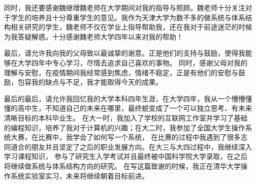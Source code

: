同时，我还要感谢魏继增魏老师在大学期间对我的指导与照顾。魏老师十分关注对于学生的培养且十分尊重学生的意见。我作为天津大学为数不多的做系统与体系结构相关研究的学生，魏老师不仅在学业上指导帮助我，还在我对于前途迷茫的时候为我答疑解惑。十分感谢魏老师大学四年以来对我的帮助！


最后，请允许我向我的父母致以最诚挚的谢意。正是他们的支持与鼓励，使得我能够在大学四年中专心学习，尽情去追求自己喜欢的事物。
同时，感谢父母对我的理解与安慰，在疫情期间我经常感到焦虑，情绪不稳定，正是有他们的安慰与鼓励，包容我的缺点与不足，我才能取得今天的成果。

最后的最后，请允许我回忆我的大学本科四年生涯，在大学四年，我从一个懵懵懂懂的高中生，不知道自己的未来在哪里，最终蜕变成了一个可以独立思考、有未来清晰目标的本科毕业生。 在大一时，我加入了学校的互联网工作室并学习了基础的编程知识，培养了我对于计算机的兴趣；在大二时，我参加了全国大学生操作系统大赛，在比赛中，我学会了如何写一个系统， 在比赛的过程中我遇到了很多志同道合的朋友并且坚定了之后的职业发展方向。在大三与大四过程中，我继续深入学习课程知识， 参与了研究生入学考试并且最终被中国科学院大学录取，在之后将继续做系统与体系结构方向的研究。 在写这篇致谢的时候，我正在清华大学操作系统实验室实习，未来将继续朝着目标前进。


\clearpage